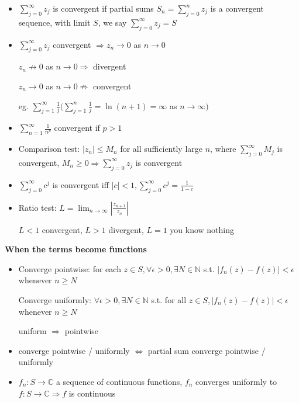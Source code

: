 \documentclass[10pt,a4paper]{article}
\begin{document}
\begin{multicols}{2}
\begin{itemize}
    \item $\sum_{j=0}^\infty z_j$ is convergent if partial sums $S_n=\sum_{j=0}^n z_j$ is a convergent sequence, with limit $S$, we say $\sum_{j=0}^\infty z_j=S$
    \item $\sum_{j=0}^\infty z_j$ convergent $\Rightarrow z_n\to 0$ as $n\to 0$
      
      $z_n \not\rightarrow 0$ as $n\to 0 \Rightarrow$ divergent 
    
      $z_n \to 0$ as $n\to 0 \not\Rightarrow$ convergent 
      
      eg. $\sum_{j=1}^\infty \frac{1}{j} (\sum_{j=1}^n \frac{1}{j}=\ln(n+1)=\infty$ as $n \to \infty)$
    \item $\sum_{n=1}^\infty \frac{1}{n^p}$ convergent if $p>1$
    
    \item Comparison test: $|z_n|\leq M_n$ for all sufficiently large $n$, where $\sum_{j=0}^\infty M_j$ is convergent, $M_n \geq 0 \Rightarrow \sum_{j=0}^\infty z_j$ is convergent
    
    \item $\sum_{j=0}^\infty c^j$ is convergent iff $|c|<1 , \sum_{j=0}^\infty c^j=\frac{1}{1-c}$
    \item Ratio test: $\displaystyle L=\lim_{n\to \infty}\left| \frac{z_{n+1}}{z_n}\right|$
      
      $L<1$ convergent, $L>1$ divergent, $L=1$ you know nothing
\end{itemize}

\textbf{When the terms become functions}

\begin{itemize}
    \item Converge pointwise: for each $z\in S, \forall \epsilon>0, \exists N \in \mathbb N$ s.t. $|f_n(z)-f(z)|<\epsilon$ whenever $n \geq N$

    Converge uniformly: $\forall \epsilon>0, \exists N\in \mathbb N$ s.t. for all $z \in S, |f_n(z)-f(z)|<\epsilon$ whenever $n \geq N$
  
    uniform $\Rightarrow$ pointwise
  
  \item converge pointwise / uniformly $\Leftrightarrow$ partial sum converge pointwise / uniformly
  
  \item $f_n: S\to \mathbb C$ a sequence of continuous functions, $f_n$ converges uniformly to $f:S\to\mathbb C \Rightarrow f$ is continuous
  

\end{itemize}
\end{multicols}
\end{document}
